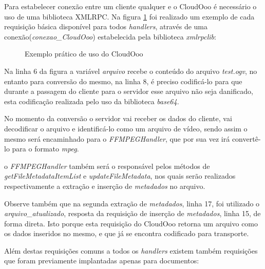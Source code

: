 Para estabelecer conexão entre um cliente qualquer e o CloudOoo é necessário o uso de uma biblioteca XMLRPC. Na figura \ref{conexao} foi realizado um exemplo de cada requisição básica disponível para todos \textit{handlers}, através de uma conexão(\textit{conexao_CloudOoo}) estabelecida pela biblioteca \textit{xmlrpclib}:

\begin{figure}[ht]
    \centering
    \caption{Exemplo prático de uso do CloudOoo}
    \label{conexao}
\end{figure}

Na linha 6 da figura a variável \textit{arquivo} recebe o conteúdo do arquivo \textit{test.ogv}, no entanto para conversão do mesmo, na linha 8, é preciso codificá-lo para que durante a passagem do cliente para o servidor esse arquivo não seja danificado, esta codificação  realizada pelo uso da biblioteca \textit{base64}.

No momento da conversão o servidor vai receber os dados do cliente, vai decodificar o arquivo e identificá-lo como um arquivo de vídeo, sendo assim o mesmo será encaminhado para o \textit{FFMPEGHandler}, que por sua vez irá convertê-lo para o formato \textit{mpeg}.

o \textit{FFMPEGHandler} também será o responsável pelos métodos de \textit{getFileMetadataItemList} e \textit{updateFileMetadata}, nos quais serão realizados respectivamente a extração e inserção de \textit{metadados} no arquivo.

Observe também que na segunda extração de \textit{metadados}, linha 17, foi utilizado o \textit{arquivo_atualizado}, resposta da requisição de inserção de \textit{metadados}, linha 15, de forma direta. Isto porque esta requisição do CloudOoo retorna um arquivo como os dados inseridos no mesmo, e que já se encontra codificado para transporte.

Além destas requisições comuns a todos os \textit{handlers} existem também requisições que foram previamente implantadas apenas para documentos:

